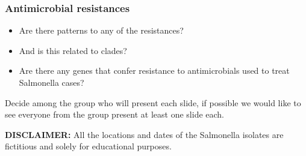 \documentclass[11pt]{article}
\providecommand{\tightlist}{%
      \setlength{\itemsep}{0pt}\setlength{\parskip}{0pt}}
\begin{document}
\hypertarget{antimicrobial-resistances}{%
\subsubsection{Antimicrobial
resistances}\label{antimicrobial-resistances}}

\begin{itemize}
\tightlist
\item
  Are there patterns to any of the resistances?
\item
  And is this related to clades?
\item
  Are there any genes that confer resistance to antimicrobials used to
  treat Salmonella cases?
\end{itemize}

Decide among the group who will present each slide, if possible we would
like to see everyone from the group present at least one slide each.

    \textbf{DISCLAIMER:} All the locations and dates of the Salmonella
isolates are fictitious and solely for educational purposes.


\end{document}
